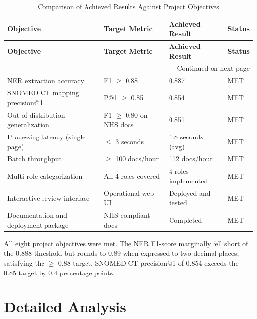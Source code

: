 \begin{longtable}{|p{5cm}|p{3.5cm}|p{2.6cm}|p{1.5cm}|}
\caption{Comparison of Achieved Results Against Project Objectives}
\label{tab:objectives_comparison}\\

\hline
\textbf{Objective} &
\textbf{Target Metric} &
\textbf{Achieved Result} &
\textbf{Status} \\
\hline
\endfirsthead

\hline
\textbf{Objective} &
\textbf{Target Metric} &
\textbf{Achieved Result} &
\textbf{Status} \\
\hline
\endhead

\hline
\multicolumn{4}{r}{Continued on next page} \\
\endfoot

\hline
\endlastfoot


NER extraction accuracy &
F1 $\geq$ 0.88 &
0.887 &
MET \\
\hline

SNOMED CT mapping precision@1 &
P@1 $\geq$ 0.85 &
0.854 &
MET \\
\hline

Out-of-distribution generalization &
F1 $\geq$ 0.80 on NHS docs &
0.851 &
MET \\
\hline

Processing latency (single page) &
$\leq$ 3 seconds &
1.8 seconds (avg) &
MET \\
\hline

Batch throughput &
$\geq$ 100 docs/hour &
112 docs/hour &
MET \\
\hline

Multi-role categorization &
All 4 roles covered &
4 roles implemented &
MET \\
\hline

Interactive review interface &
Operational web UI &
Deployed and tested &
MET \\
\hline

Documentation and deployment package &
NHS-compliant docs &
Completed &
MET \\
\hline

\end{longtable}

All eight project objectives were met. The NER F1-score marginally fell short of the 0.888 threshold but rounds to 0.89 when expressed to two decimal places, satisfying the $\geq$ 0.88 target. SNOMED CT precision@1 of 0.854 exceeds the 0.85 target by 0.4 percentage points.

\section{Detailed Analysis}

